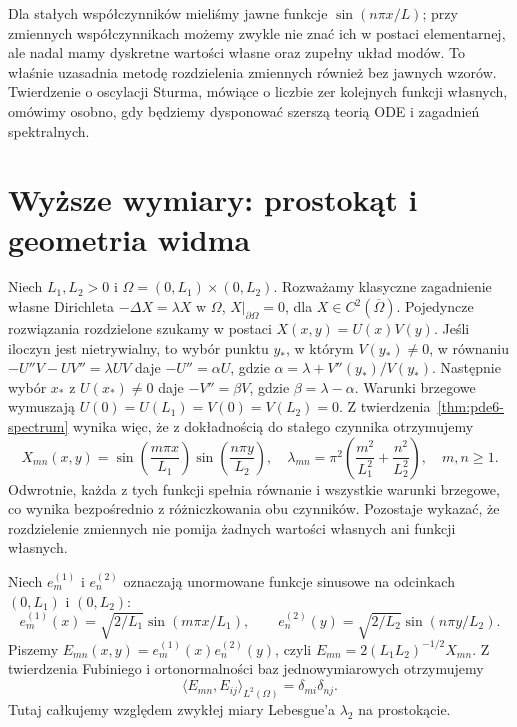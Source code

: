 \begin{uwaga}
Dla stałych współczynników mieliśmy jawne funkcje
$\sin(n\pi x/L)$; przy zmiennych współczynnikach
możemy zwykle nie znać ich w postaci elementarnej,
ale nadal mamy dyskretne wartości własne oraz
zupełny układ modów. To właśnie uzasadnia metodę
rozdzielenia zmiennych również bez jawnych wzorów.
Twierdzenie o oscylacji Sturma, mówiące o liczbie
zer kolejnych funkcji własnych, omówimy osobno,
gdy będziemy dysponować szerszą teorią ODE i
zagadnień spektralnych.
\end{uwaga}

\section{Wyższe wymiary: prostokąt i geometria widma}
\label{sec:pde6-rectangle}

Niech $L_1,L_2>0$ i $\Omega=(0,L_1)\times(0,L_2)$.
Rozważamy klasyczne zagadnienie własne Dirichleta
$-\Delta X=\lambda X$ w $\Omega$, $X|_{\partial\Omega}=0$,
dla $X\in C^2(\overline\Omega)$.
Pojedyncze rozwiązania rozdzielone szukamy w postaci
$X(x,y)=U(x)V(y)$. Jeśli iloczyn jest nietrywialny,
to wybór punktu $y_*$, w którym $V(y_*)\ne0$, w równaniu
$-U''V-UV''=\lambda UV$ daje
$-U''=\alpha U$, gdzie
$\alpha=\lambda+V''(y_*)/V(y_*)$.
Następnie wybór $x_*$ z $U(x_*)\ne0$ daje
$-V''=\beta V$, gdzie $\beta=\lambda-\alpha$.
Warunki brzegowe wymuszają
$U(0)=U(L_1)=V(0)=V(L_2)=0$.
Z twierdzenia~\ref{thm:pde6-spectrum} wynika więc,
że z dokładnością do stałego czynnika otrzymujemy
\begin{equation}\label{eq:pde6-rectangle}
 X_{mn}(x,y)=\sin\left(\frac{m\pi x}{L_1}\right)
 \sin\left(\frac{n\pi y}{L_2}\right),\quad
 \lambda_{mn}=\pi^2\left(\frac{m^2}{L_1^2}
 +\frac{n^2}{L_2^2}\right),\quad m,n\ge1.
\end{equation}
Odwrotnie, każda z tych funkcji spełnia równanie
i wszystkie warunki brzegowe, co wynika bezpośrednio
z różniczkowania obu czynników. Pozostaje wykazać,
że rozdzielenie zmiennych nie pomija żadnych wartości
własnych ani funkcji własnych.

Niech $e_m^{(1)}$ i $e_n^{(2)}$ oznaczają unormowane
funkcje sinusowe na odcinkach $(0,L_1)$ i $(0,L_2)$:
\[
 e_m^{(1)}(x)=\sqrt{2/L_1}\sin(m\pi x/L_1),\qquad
 e_n^{(2)}(y)=\sqrt{2/L_2}\sin(n\pi y/L_2).
\]
Piszemy $E_{mn}(x,y)=e_m^{(1)}(x)e_n^{(2)}(y)$,
czyli $E_{mn}=2(L_1L_2)^{-1/2}X_{mn}$.
Z twierdzenia Fubiniego i ortonormalności baz
jednowymiarowych otrzymujemy
\[
 \langle E_{mn},E_{ij}\rangle_{L^2(\Omega)}
 =\delta_{mi}\delta_{nj}.
\]
Tutaj całkujemy względem zwykłej miary Lebesgue'a
$\lambda_2$ na prostokącie.

